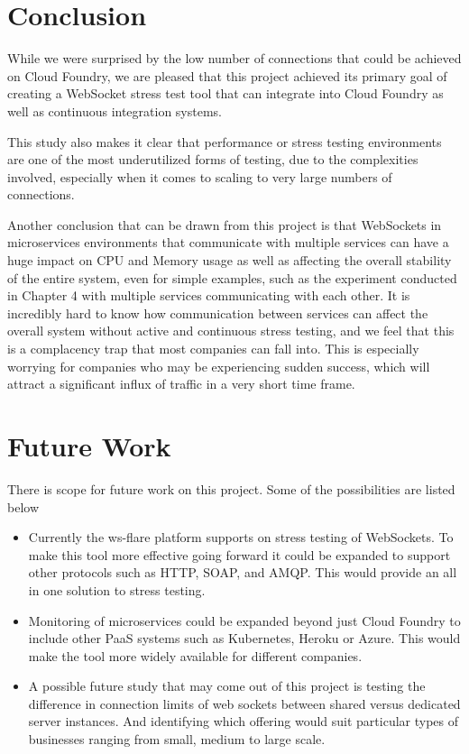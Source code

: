 \section{Conclusion}

While we were surprised by the low number of connections that could be achieved on Cloud Foundry, we are pleased that this project achieved its primary goal of creating a WebSocket stress test tool that can integrate into Cloud Foundry as well as continuous integration systems. 

This study also makes it clear that performance or stress testing environments are one of the most underutilized forms of testing, due to the complexities involved, especially when it comes to scaling to very large numbers of connections.

Another conclusion that can be drawn from this project is that WebSockets in microservices environments that communicate with multiple services can have a huge impact on CPU and Memory usage as well as affecting the overall stability of the entire system, even for simple examples, such as the experiment conducted in Chapter 4 with multiple services communicating with each other. It is incredibly hard to know how communication between services can affect the overall system without active and continuous stress testing, and we feel that this is a complacency trap that most companies can fall into. This is especially worrying for companies who may be experiencing sudden success, which will attract a significant influx of traffic in a very short time frame. 

\section{Future Work}

There is scope for future work on this project. Some of the possibilities are listed below

\begin{itemize}
  \item Currently the ws-flare platform supports on stress testing of WebSockets. To make this tool more effective going forward it could be expanded to support other protocols such as HTTP, SOAP, and AMQP. This would provide an all in one solution to stress testing. 
  \item Monitoring of microservices could be expanded beyond just Cloud Foundry to include other PaaS systems such as Kubernetes, Heroku or Azure. This would make the tool more widely available for different companies.
  \item A possible future study that may come out of this project is testing the difference in connection limits of web sockets between shared versus dedicated server instances. And identifying which offering would suit particular types of businesses ranging from small, medium to large scale.
\end{itemize}